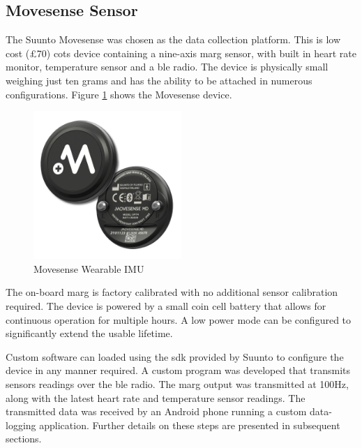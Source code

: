 \subsection{Movesense Sensor}
The Suunto Movesense was chosen as the data collection platform. This is low cost (£70) \acrfull{cots} device containing a nine-axis \acrshort{marg} sensor, with built in heart rate monitor, temperature sensor and a \acrfull{ble} radio. The device is physically small weighing just ten grams and has the ability to be attached in numerous configurations. Figure \ref{fig:methods-movesense-sensor} shows the Movesense device.

\begin{figure}[hbt]
    \centering
    \includegraphics[width=0.5\textwidth]{content/3-Methods/Movesense-MD-front-and-back.png}
    \caption[Movesense Wearable IMU]{Movesense Wearable IMU\cite{}} %
    \label{fig:methods-movesense-sensor}
\end{figure}

The on-board \acrshort{marg} is factory calibrated with no additional sensor calibration required. The device is powered by a small coin cell battery that allows for continuous operation for multiple hours. A low power mode can be configured to significantly extend the usable lifetime.

Custom software can loaded using the \acrfull{sdk} provided by Suunto to configure the device in any manner required. A custom program was developed that transmits sensors readings over the \acrshort{ble} radio. The \acrshort{marg} output was transmitted at 100Hz, along with the latest heart rate and temperature sensor readings. The transmitted data was received by an Android phone running a custom data-logging application. Further details on these steps are presented in subsequent sections.

